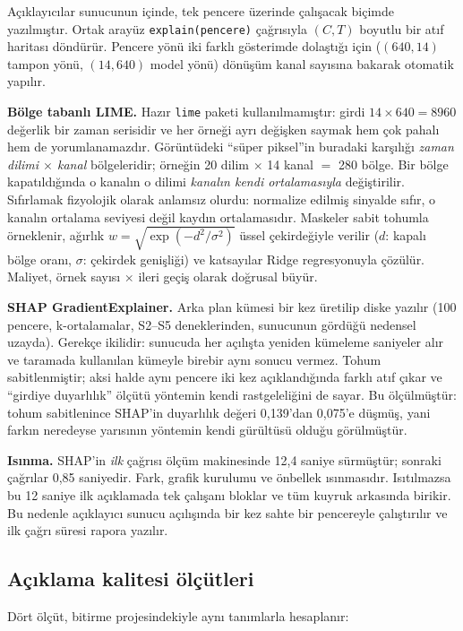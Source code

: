 \documentclass[conference]{IEEEtran}
\begin{document}
Açıklayıcılar sunucunun içinde, tek pencere üzerinde çalışacak biçimde
yazılmıştır. Ortak arayüz \texttt{explain(pencere)} çağrısıyla $(C,T)$ boyutlu
bir atıf haritası döndürür. Pencere yönü iki farklı gösterimde dolaştığı için
($(640,14)$ tampon yönü, $(14,640)$ model yönü) dönüşüm kanal sayısına bakarak
otomatik yapılır.

\textbf{Bölge tabanlı LIME.} Hazır \texttt{lime} paketi kullanılmamıştır: girdi
$14\times640 = 8960$ değerlik bir zaman serisidir ve her örneği ayrı değişken
saymak hem çok pahalı hem de yorumlanamazdır. Görüntüdeki ``süper piksel''in
buradaki karşılığı \emph{zaman dilimi $\times$ kanal} bölgeleridir; örneğin 20
dilim $\times$ 14 kanal $=$ 280 bölge. Bir bölge kapatıldığında o kanalın o
dilimi \emph{kanalın kendi ortalamasıyla} değiştirilir. Sıfırlamak fizyolojik
olarak anlamsız olurdu: normalize edilmiş sinyalde sıfır, o kanalın ortalama
seviyesi değil kaydın ortalamasıdır. Maskeler sabit tohumla örneklenir, ağırlık
$w = \sqrt{\exp(-d^2/\sigma^2)}$ üssel çekirdeğiyle verilir ($d$: kapalı bölge
oranı, $\sigma$: çekirdek genişliği) ve katsayılar Ridge regresyonuyla
çözülür. Maliyet, örnek sayısı $\times$ ileri geçiş olarak doğrusal büyür.

\textbf{SHAP GradientExplainer.} Arka plan kümesi bir kez üretilip diske
yazılır (100 pencere, k-ortalamalar, S2--S5 deneklerinden, sunucunun gördüğü
nedensel uzayda). Gerekçe ikilidir: sunucuda her açılışta yeniden kümeleme
saniyeler alır ve taramada kullanılan kümeyle birebir aynı sonucu vermez.
Tohum sabitlenmiştir; aksi halde aynı pencere iki kez açıklandığında farklı atıf
çıkar ve ``girdiye duyarlılık'' ölçütü yöntemin kendi rastgeleliğini de sayar.
Bu ölçülmüştür: tohum sabitlenince SHAP'in duyarlılık değeri 0{,}139'dan
0{,}075'e düşmüş, yani farkın neredeyse yarısının yöntemin kendi gürültüsü
olduğu görülmüştür.

\textbf{Isınma.} SHAP'in \emph{ilk} çağrısı ölçüm makinesinde 12{,}4 saniye
sürmüştür; sonraki çağrılar 0{,}85 saniyedir. Fark, grafik kurulumu ve önbellek
ısınmasıdır. Isıtılmazsa bu 12 saniye ilk açıklamada tek çalışanı bloklar ve tüm
kuyruk arkasında birikir. Bu nedenle açıklayıcı sunucu açılışında bir kez sahte
bir pencereyle çalıştırılır ve ilk çağrı süresi rapora yazılır.

\subsection{Açıklama kalitesi ölçütleri}

Dört ölçüt, bitirme projesindekiyle aynı tanımlarla hesaplanır:
\end{document}
